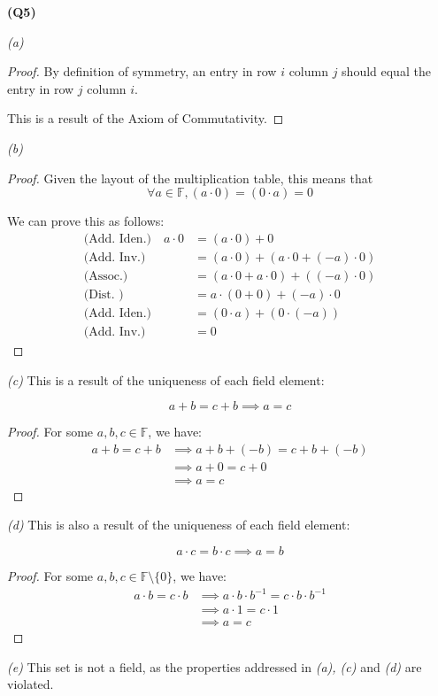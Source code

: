 \documentclass[12pt, a4paper]{article}
\newcommand{\F}{\mathbb{F}}
\begin{document}
\textbf{(Q5)}

\textit{(a)}
\begin{proof}
    By definition of symmetry, an entry in row $i$ column $j$
    should equal the entry in row $j$ column $i$.

    This is a result of the Axiom of Commutativity.
\end{proof}

\textit{(b)}
\begin{proof}
    Given the layout of the multiplication table, this means that
    \[
        \forall a \in \F, (a \cdot 0) = (0 \cdot a) = 0
    \]

    We can prove this as follows:
    \begin{align*}
        \text{(Add. Iden.)} \quad a \cdot 0 & = (a \cdot 0) + 0\\
        \text{(Add. Inv.)} \quad & = (a \cdot 0) + (a \cdot 0 + (-a) \cdot 0)\\
        \text{(Assoc.)} \quad & = (a \cdot 0 + a \cdot 0) + ((-a) \cdot 0)\\
        \text{(Dist. )} \quad & = a \cdot (0 + 0) + (-a) \cdot 0\\
        \text{(Add. Iden.)} \quad & = (0 \cdot a) + (0 \cdot (-a))\\
        \text{(Add. Inv.)} \quad & = 0
    \end{align*}
\end{proof}

\textit{(c)}
This is a result of the uniqueness of each field element:

\[
a + b = c + b \implies a = c
\]

\begin{proof}
    For some $a, b, c \in \F$, we have:
    \begin{align*}
        a + b = c + b & \implies a + b + (-b) = c + b + (-b)\\
        & \implies a + 0 = c + 0\\
        & \implies a = c
    \end{align*}
\end{proof}

\textit{(d)}
This is also a result of the uniqueness of each field element:

\[
    a \cdot c = b \cdot c \implies a = b
\]

\begin{proof}
    For some $a, b, c \in \F \setminus \{0\}$, we have:
    \begin{align*}
        a \cdot b = c \cdot b & \implies 
        a \cdot b \cdot b^{-1} = c \cdot b \cdot b^{-1}\\
        & \implies a \cdot 1 = c \cdot 1\\
        & \implies a = c
    \end{align*}
\end{proof}

\textit{(e)} This set is not a field, as the properties addressed in
\textit{(a), (c)} and \textit{(d)} are violated.
\end{document}
